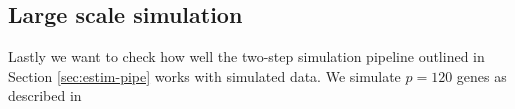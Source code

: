 \subsection{Large scale simulation}
\label{sec:large-scale-model}

Lastly we want to check how well the two-step simulation pipeline outlined in Section \ref{sec:estim-pipe} works with simulated data. We simulate $p=120$ genes as described in 

